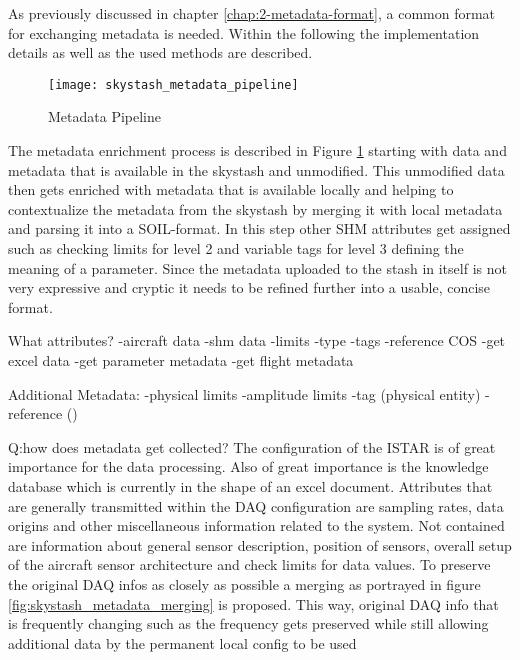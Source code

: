 As previously discussed in chapter \ref{chap:2-metadata-format}, a common format for exchanging metadata is needed. Within the following the implementation details as well as the used methods are described.

\begin{figure}
    \centering
    \texttt{[image: skystash\_metadata\_pipeline]}
    \caption{Metadata Pipeline}
    \label{fig:skystash_metadata_pipeline}
\end{figure}

The metadata enrichment process is described in Figure \ref{fig:skystash_metadata_pipeline} starting with
data and metadata that is available in the skystash and unmodified. This unmodified data then gets enriched with metadata that is available locally and helping to contextualize the metadata from the skystash by merging it with local metadata and parsing it into a SOIL-format.
In this step other SHM attributes get assigned such as checking limits for level 2 and variable tags for level 3 defining the meaning of a parameter.
Since the metadata uploaded to the stash in itself is not very expressive and cryptic it needs to be refined further into a usable, concise format.







What attributes?
-aircraft data
-shm data
-limits
-type
-tags
-reference COS
-get excel data
-get parameter metadata
-get flight metadata

Additional Metadata:
-physical limits
-amplitude limits
-tag (physical entity)
-reference ()


Q:how does metadata get collected?
The configuration of the ISTAR is of great importance for the data processing. Also of great importance is the knowledge database which is currently in the shape of an excel document.
Attributes that are generally transmitted within the DAQ configuration are sampling rates, data origins and other miscellaneous information related to the system. Not contained are information about general sensor description, position of sensors, overall setup of the aircraft sensor architecture and check limits for data values. To preserve the original DAQ infos as closely as possible a merging as portrayed in figure \ref{fig:skystash_metadata_merging} is proposed. This way, original DAQ info that is frequently changing such as the frequency gets preserved while still allowing additional data by the permanent local config to be used

